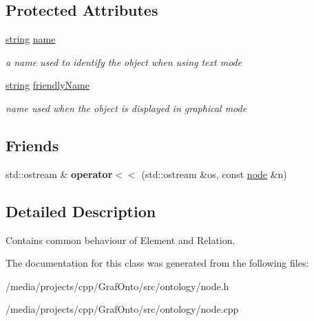 \subsection*{\-Protected \-Attributes}
\begin{DoxyCompactItemize}
\item 
\hypertarget{classmbdev__ontology_1_1node_a0f69893fcec007d0766997400830a204}{\hyperlink{classmbdev_1_1string}{string} \hyperlink{classmbdev__ontology_1_1node_a0f69893fcec007d0766997400830a204}{name}}\label{classmbdev__ontology_1_1node_a0f69893fcec007d0766997400830a204}

\begin{DoxyCompactList}\small\item\em a name used to identify the object when using text mode \end{DoxyCompactList}\item 
\hypertarget{classmbdev__ontology_1_1node_a8af5c00f684a8c06ceeddd0a2b1ff97c}{\hyperlink{classmbdev_1_1string}{string} \hyperlink{classmbdev__ontology_1_1node_a8af5c00f684a8c06ceeddd0a2b1ff97c}{friendly\-Name}}\label{classmbdev__ontology_1_1node_a8af5c00f684a8c06ceeddd0a2b1ff97c}

\begin{DoxyCompactList}\small\item\em name used when the object is displayed in graphical mode \end{DoxyCompactList}\end{DoxyCompactItemize}
\subsection*{\-Friends}
\begin{DoxyCompactItemize}
\item 
\hypertarget{classmbdev__ontology_1_1node_a08a0daf86ffe80f5be310117af4235a9}{std\-::ostream \& {\bfseries operator$<$$<$} (std\-::ostream \&os, const \hyperlink{classmbdev__ontology_1_1node}{node} \&n)}\label{classmbdev__ontology_1_1node_a08a0daf86ffe80f5be310117af4235a9}

\end{DoxyCompactItemize}


\subsection{\-Detailed \-Description}
\-Contains common behaviour of \-Element and \-Relation. 

\-The documentation for this class was generated from the following files\-:\begin{DoxyCompactItemize}
\item 
/media/projects/cpp/\-Graf\-Onto/src/ontology/node.\-h\item 
/media/projects/cpp/\-Graf\-Onto/src/ontology/node.\-cpp\end{DoxyCompactItemize}
